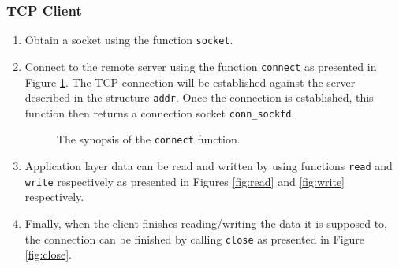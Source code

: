 \documentclass[pdftex,12pt,a4paper]{article}
\begin{document}
            \subsubsection{TCP Client}
                \begin{enumerate}
                    \item Obtain a socket using the function \texttt{socket}.
                    \item Connect to the remote server using the function
                        \texttt{connect} as presented in Figure
                        \ref{fig:connect}. The TCP connection will be
                        established against the server described in the
                        structure \texttt{addr}. Once the connection is
                        established, this function then returns a
                        connection socket \texttt{conn\_sockfd}.
                        \begin{figure}[tbh]
                            \centering
                            
                            \caption{The synopsis of the \texttt{connect} function.}
                            \label{fig:connect}
                        \end{figure}
                    \item Application layer data can be read and written by using
                        functions \texttt{read} and \texttt{write} respectively
                        as presented in Figures \ref{fig:read} and
                        \ref{fig:write} respectively.
                    \item Finally, when the client finishes reading/writing the
                        data it is supposed to, the connection can be finished
                        by calling \texttt{close} as presented in Figure
                        \ref{fig:close}.
                \end{enumerate}
\end{document}
